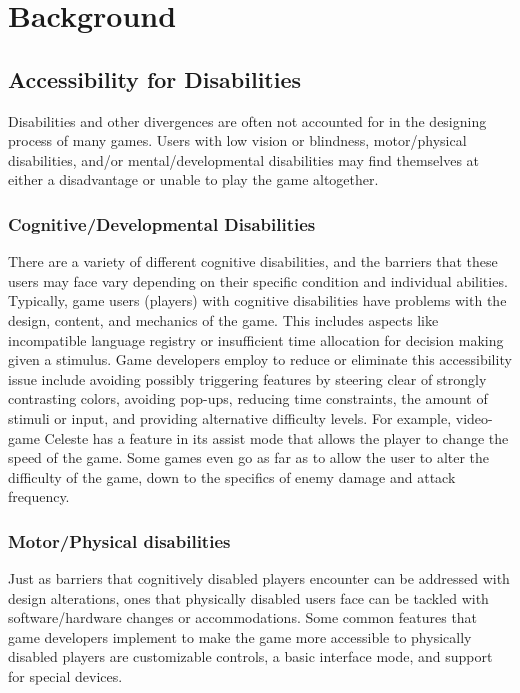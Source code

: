 \documentclass[10pt,twocolumn]{article}
\begin{document}
\section{Background}

\subsection{Accessibility for Disabilities}
    Disabilities and other divergences are often not accounted for in the designing process of many games. Users with low vision or blindness, motor/physical disabilities, and/or mental/developmental disabilities may find themselves at either a disadvantage or unable to play the game altogether.
\subsubsection{Cognitive/Developmental Disabilities}
    There are a variety of different cognitive disabilities, and the barriers that these users may face vary depending on their specific condition and individual abilities. \cite{torrente2014towards} Typically, game users (players) with cognitive disabilities have problems with the design, content, and mechanics of the game. \cite{torrente2014towards} This includes aspects like incompatible language registry or insufficient time allocation for decision making given a stimulus. Game developers employ to reduce or eliminate this accessibility issue include avoiding possibly triggering features by steering clear of strongly contrasting colors, avoiding pop-ups, reducing time constraints, the amount of stimuli or input, and providing alternative difficulty levels. \cite{torrente2014towards} For example, video-game Celeste has a feature in its assist mode that allows the player to change the speed of the game. Some games even go as far as to allow the user to alter the difficulty of the game, down to the specifics of enemy damage and attack frequency. 


\subsubsection{Motor/Physical disabilities}
    Just as barriers that cognitively disabled players encounter can be addressed with design alterations, ones that physically disabled users face can be tackled with software/hardware changes or accommodations. Some common features that game developers implement to make the game more accessible to physically disabled players are customizable controls, a basic interface mode, and support for special devices. \cite{eskelinen2001gaming} 
\end{document}
